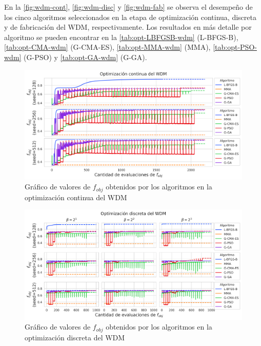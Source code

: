 En la \autoref{fig:wdm-cont}, \autoref{fig:wdm-disc} y \autoref{fig:wdm-fab} se observa 
el desempeño de los cinco algoritmos seleccionados en la etapa de optimización continua, discreta y
de fabricación del WDM, respectivamente.
Los resultados en más detalle por algoritmo se pueden encontrar en la
\autoref{tab:opt-LBFGSB-wdm} (L-BFGS-B),
\autoref{tab:opt-CMA-wdm} (G-CMA-ES),
\autoref{tab:opt-MMA-wdm} (MMA),
\autoref{tab:opt-PSO-wdm} (G-PSO) y
\autoref{tab:opt-GA-wdm} (G-GA).

\begin{landscape}
\begin{figure}[ht]
  \centering
  \includegraphics[scale=1.0]{image/results/wdm/wdm-opt-cont.png}
  \caption{Gráfico de valores de $f_{obj}$ obtenidos por los algoritmos en la optimización continua del WDM}
  \label{fig:wdm-cont}
\end{figure}
\end{landscape}

\begin{landscape}
\begin{figure}[ht]
  \centering
  \includegraphics[scale=1.0]{image/results/wdm/wdm-opt-disc.png}
  \caption{Gráfico de valores de $f_{obj}$ obtenidos por los algoritmos en la optimización discreta del WDM}
  \label{fig:wdm-disc}
\end{figure}
\end{landscape}

